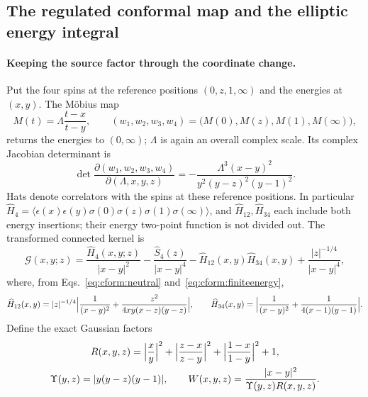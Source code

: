 \documentclass[11pt,a4paper]{article}
\numberwithin{equation}{section}
\begin{document}
\subsection{The regulated conformal map and the elliptic energy integral}\label{app:cform:ellipticmap}
\paragraph{Keeping the source factor through the coordinate change.} Put the four spins at the reference positions
$(0,z,1,\infty)$ and the energies at $(x,y)$. The M\"obius map
\begin{equation}
 M(t)=\Lambda\frac{t-x}{t-y},\qquad (w_1,w_2,w_3,w_4)=\bigl(M(0),M(z),M(1),M(\infty)\bigr),
 \label{eq:cform:mobius}
\end{equation}
returns the energies to $(0,\infty)$; $\Lambda$ is again an overall complex scale. Its complex Jacobian determinant is
\begin{equation}
 \det\frac{\partial(w_1,w_2,w_3,w_4)}{\partial(\Lambda,x,y,z)}=-\frac{\Lambda^3(x-y)^2}{y^2(y-z)^2(y-1)^2}.
\end{equation}
Hats denote correlators with the spins at these reference positions. In particular
$\widehat H_4=\langle\epsilon(x)\epsilon(y)\sigma(0)\sigma(z)\sigma(1)\sigma(\infty)\rangle$, and
$\widehat H_{12},\widehat H_{34}$ each include both energy insertions; their energy two-point function is not divided
out. The transformed connected kernel is
\begin{equation}
 \mathcal G(x,y;z)=\frac{\widehat H_4(x,y;z)}{|x-y|^2}-\frac{\widehat S_4(z)}{|x-y|^4}
 -\widehat H_{12}(x,y)\widehat H_{34}(x,y)+\frac{|z|^{-1/4}}{|x-y|^4},
 \label{eq:cform:G}
\end{equation}
where, from Eqs.~\eqref{eq:cform:neutral} and~\eqref{eq:cform:finiteenergy},
\begin{equation}
 \widehat H_{12}(x,y)=|z|^{-1/4}\Bigl|\frac1{(x-y)^2}+\frac{z^2}{4xy(x-z)(y-z)}\Bigr|,\qquad
 \widehat H_{34}(x,y)=\Bigl|\frac1{(x-y)^2}+\frac1{4(x-1)(y-1)}\Bigr|.
\end{equation}
Define the exact Gaussian factors
\begin{equation}
\begin{gathered}
 R(x,y,z)=\Bigl|\frac xy\Bigr|^2+\Bigl|\frac{z-x}{z-y}\Bigr|^2+\Bigl|\frac{1-x}{1-y}\Bigr|^2+1,\\
 \Upsilon(y,z)=|y(y-z)(y-1)|,\qquad
 W(x,y,z)=\frac{|x-y|^2}{\Upsilon(y,z)R(x,y,z)}.
\end{gathered}
 \label{eq:cform:W}
\end{equation}
\end{document}
